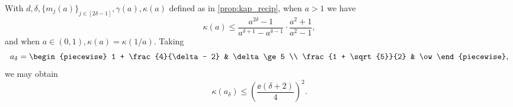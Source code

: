 \begin{proposition}
  With $d, \delta, \{m_j(a)\}_{j \in [2 \delta - 1]}, \gamma(a), \kappa(a)$ defined as in \cref{prop:kap_recip}, when $a > 1$ we have \begin{equation}\kappa(a) \le \dfrac{a^{2 \delta} - 1}{a^{\delta + 1} - a^{\delta - 1}} \cdot \dfrac{a^2 + 1}{a^2 - 1},\label{eq:kap_est}\end{equation} and when $a \in (0, 1), \kappa(a) = \kappa(1 / a)$.  Taking \[a_\delta = \begin{piecewise} 1 + \frac{4}{\delta - 2} & \delta \ge 5 \\ \frac{1 + \sqrt{5}}{2} & \ow \end{piecewise},\] we may obtain \begin{equation} \kappa(a_\delta) \le \left(\dfrac{\ee (\delta + 2)}{4}\right)^2. \label{eq:kap_opt} \end{equation}
  \label{prop:exp_kappa}
\end{proposition}

